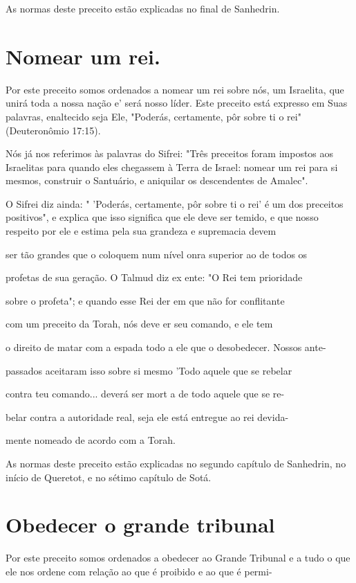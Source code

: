 \begin{itemize}
\begin{enumrate}
\begin{itemize}
\begin{itemize}
\begin{itemize}
As normas deste preceito estão explicadas no final de Sanhedrin.



\section{Nomear um rei.}

Por este preceito somos ordenados a nomear um rei sobre nós, um
Israelita, que unirá toda a nossa nação e' será nosso líder. Este
preceito está ex­presso em Suas palavras, enaltecido seja Ele, "Poderás,
certamente, pôr sobre ti o rei" (Deuteronômio 17:15).

Nós já nos referimos às palavras do Sifrei: "Três preceitos foram
im­postos aos Israelitas para quando eles chegassem à Terra de Israel:
nomear um rei para si mesmos, construir o Santuário, e aniquilar os
descendentes de Amalec".

O Sifrei diz ainda: " 'Poderás, certamente, pôr sobre ti o rei' é um dos
preceitos positivos", e explica que isso significa que ele deve ser
temido, e que nosso respeito por ele e estima pela sua grandeza e
supremacia devem

ser tão grandes que o coloquem num nível onra superior ao de todos os

profetas de sua geração. O Talmud diz ex ente: "O Rei tem prioridade

sobre o profeta"; e quando esse Rei der em que não for conflitante

com um preceito da Torah, nós deve er seu comando, e ele tem

o direito de matar com a espada todo a ele que o desobedecer. Nossos
ante-

passados aceitaram isso sobre si mesmo 'Todo aquele que se rebelar

contra teu comando... deverá ser mort a de todo aquele que se re-

belar contra a autoridade real, seja ele está entregue ao rei devida-

mente nomeado de acordo com a Torah.

As normas deste preceito estão explicadas no segundo capítulo de
Sanhedrin, no início de Queretot, e no sétimo capítulo de Sotá.

\section{Obedecer o grande tribunal}

Por este preceito somos ordenados a obedecer ao Grande Tribunal e a tudo
o que ele nos ordene com relação ao que é proibido e ao que é permi-




\end{itemize}
\end{itemize}
\end{itemize}
\end{enumrate}
\end{itemize}
